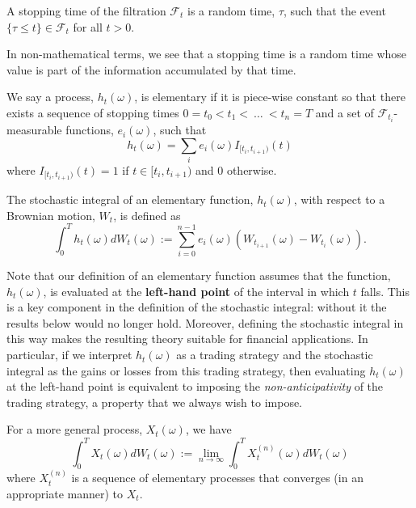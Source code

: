 \begin{definition}
A stopping time of the filtration $\mathcal{F}_t$ is a random time, $\tau$, such that the event $\{\tau\leq t\}\in\mathcal{F}_t$ for all $t>0$.
\end{definition}
In non-mathematical terms, we see that a stopping time is a random time whose value is part of the information accumulated by that time.

\begin{definition}
We say a process, $h_{t}(\omega)$, is elementary if it is piece-wise constant so that there exists a sequence of stopping times $0=t_0<t_1<\ \ldots\ <t_n=T$ and a set of $\mathcal{F}_{t_i}$-measurable functions, $e_i(\omega)$, such that
\[h_t(\omega) = \sum_i e_i(\omega) I_{[t_i,t_{i+1})}(t)\]
where $I_{[t_i,t_{i+1})}(t)=1$ if $t\in[t_i,t_{i+1})$ and $0$ otherwise.
\end{definition}

\begin{definition}
The stochastic integral of an elementary function, $h_t(\omega)$, with respect to a Brownian motion, $W_t$, is defined as
\[\int_0^T h_t(\omega) dW_t(\omega) := \sum_{i=0}^{n-1} e_i(\omega) (W_{t_{i+1}}(\omega)-W_{t_i}(\omega)). \tag{2}\]
\end{definition}
Note that our definition of an elementary function assumes that the function, $h_t(\omega)$, is evaluated at the \textbf{left-hand point} of the interval in which $t$ falls. This is a key component in the definition of the stochastic integral: without it the results below would no longer hold. Moreover, defining the stochastic integral in this way makes the resulting theory suitable for financial applications. In particular, if we interpret $h_t(\omega)$ as a trading strategy and the stochastic integral as the gains or losses from this trading strategy, then evaluating $h_t(\omega)$ at the left-hand point is equivalent to imposing the \textit{non-anticipativity} of the trading strategy, a property that we always wish to impose.

For a more general process, $X_t(\omega)$, we have
\[\int_0^T X_t(\omega) dW_t(\omega) := \lim_{n\to\infty} \int_0^T X_t^{(n)}(\omega) dW_t(\omega)\]
where $X_t^{(n)}$ is a sequence of elementary processes that converges (in an appropriate manner) to $X_t$.

